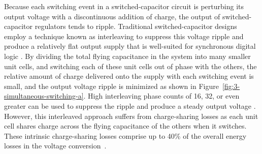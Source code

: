 \documentclass[graybox]{svmult}
\begin{document}

Because each switching event in a switched-capacitor circuit is perturbing its output voltage with a discontinuous addition of charge, the output of switched-capacitor regulators tends to ripple.
Traditional switched-capacitor designs employ a technique known as interleaving to suppress this voltage ripple and produce a relatively flat output supply that is well-suited for synchronous digital logic \cite{Clerc2015, Jain2014, Jiang2017, Kim2015, Song2015, Teh2016}.
By dividing the total flying capacitance in the system into many smaller unit cells, and switching each of these unit cells out of phase with the others, the relative amount of charge delivered onto the supply with each switching event is small, and the output voltage ripple is minimized as shown in Figure~\ref{fig:3-simultaneous-switching-a}.
High interleaving phase counts of 16, 32, or even greater can be used to suppress the ripple and produce a steady output voltage \cite{Andersen2014, Le2011, Pique2012}.
However, this interleaved approach suffers from charge-sharing losses as each unit cell shares charge across the flying capacitance of the others when it switches.
These intrinsic charge-sharing losses comprise up to 40\% of the overall energy losses in the voltage conversion~\cite{Jevtic2014}.
\end{document}
